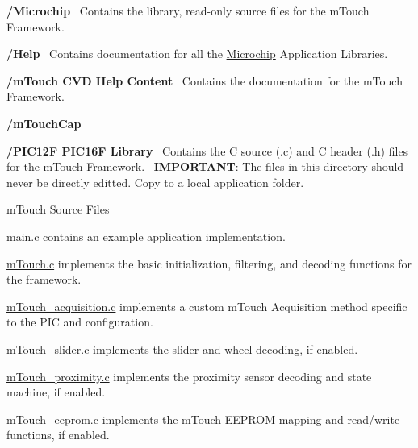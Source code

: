  
\begin{DoxyItemize}
\item {\bfseries /\+Microchip}~\newline
 Contains the library, read-\/only source files for the m\+Touch Framework. 
\begin{DoxyItemize}
\item {\bfseries /\+Help}~\newline
 Contains documentation for all the \hyperlink{namespace_microchip}{Microchip} Application Libraries. 
\begin{DoxyItemize}
\item {\bfseries /m\+Touch C\+V\+D Help Content}~\newline
 Contains the documentation for the m\+Touch Framework. 
\end{DoxyItemize}
\item {\bfseries /m\+Touch\+Cap} 
\begin{DoxyItemize}
\item {\bfseries /\+P\+I\+C12\+F P\+I\+C16\+F Library}~\newline
 Contains the C source (.c) and C header (.h) files for the m\+Touch Framework.~\newline
 {\bfseries I\+M\+P\+O\+R\+T\+A\+N\+T}\+: The files in this directory should never be directly editted. Copy to a local application folder. 
\begin{DoxyItemize}
\item m\+Touch Source Files 
\begin{DoxyItemize}
\item main.\+c contains an example application implementation. 
\item \hyperlink{m_touch_8c}{m\+Touch.\+c} implements the basic initialization, filtering, and decoding functions for the framework. 
\item \hyperlink{m_touch__acquisition_8c}{m\+Touch\+\_\+acquisition.\+c} implements a custom m\+Touch Acquisition method specific to the P\+I\+C and configuration. 
\item \hyperlink{m_touch__slider_8c}{m\+Touch\+\_\+slider.\+c} implements the slider and wheel decoding, if enabled. 
\item \hyperlink{m_touch__proximity_8c}{m\+Touch\+\_\+proximity.\+c} implements the proximity sensor decoding and state machine, if enabled. 
\item \hyperlink{m_touch__eeprom_8c}{m\+Touch\+\_\+eeprom.\+c} implements the m\+Touch E\+E\+P\+R\+O\+M mapping and read/write functions, if enabled. 

\end{DoxyItemize}
\end{DoxyItemize}
\end{DoxyItemize}
\end{DoxyItemize}
\end{DoxyItemize}
